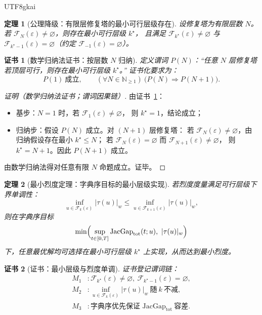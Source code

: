 \documentclass[12pt]{article}
\newtheorem{theorem}{定理}[section]
\newtheorem{Certificate}{证书}[section]
\newcommand{\NN}{\mathbb{N}}
\newcommand{\JacGap}{\ensuremath{\mathrm{JacGap}}} %
\begin{document}
\begin{CJK*}{UTF8}{gkai}
\begin{theorem}[公理降级：有限层修复塔的最小可行层级存在]
\label{thm:min-feasible-layer-exists}
设修复塔为有限层数 $N$。若 $\mathcal{F}_N(\varepsilon)\neq\varnothing$，则存在最小可行层级 $k^\star$，
且满足 $\mathcal{F}_{k^\star}(\varepsilon)\neq\varnothing$ 与 $\mathcal{F}_{k^\star-1}(\varepsilon)=\varnothing$（约定
  $\mathcal{F}_{-1}(\varepsilon)=\varnothing$）。
\end{theorem}

\begin{Certificate}[数学归纳法证书：按层数 $N$ 归纳]
\label{cert:min-feasible-layer-exists}
定义谓词 $P(N)$：“任意 $N$ 层修复塔若顶层可行，则存在最小可行层级 $k^\star$。”
证书化要求为：
\[
  P(1)\ \text{成立},\qquad
  (\forall N\in\NN_{\ge 1})\ \bigl(P(N)\Rightarrow P(N+1)\bigr).
\]
\end{Certificate}

\begin{proof}[证明（数学归纳法证书；谓词因果链）]
由证书~\ref{cert:min-feasible-layer-exists}：
\begin{itemize}
  \item 基步：$N=1$ 时，若 $\mathcal{F}_1(\varepsilon)\neq\varnothing$，
  则 $k^\star=1$，结论成立；
  \item 归纳步：假设 $P(N)$ 成立。对 $(N+1)$ 层修复塔：
  若 $\mathcal{F}_N(\varepsilon)\neq\varnothing$，由归纳假设存在最小 $k^\star\le N$；
  若 $\mathcal{F}_N(\varepsilon)=\varnothing$ 而 $\mathcal{F}_{N+1}(\varepsilon)\neq\varnothing$，
  则 $k^\star=N+1$。因此 $P(N+1)$ 成立。
\end{itemize}
由数学归纳法得对任意有限 $N$ 命题成立。证毕。
\end{proof}

\begin{theorem}[最小烈度定理：字典序目标的最小层级实现]
\label{thm:lexicographic-min-intensity}
若烈度度量满足可行层级下界单调性：
\[
  \inf_{u\in\mathcal{F}_k(\varepsilon)}|\tau(u)|_w
  \le
  \inf_{u\in\mathcal{F}_{k+1}(\varepsilon)}|\tau(u)|_w,
\]
则在字典序目标
\[
  \min\Bigl(\sup_{t\in[0,T]}\JacGap_{\mathrm{tot}}(t;u),\ |\tau(u)|_w\Bigr)
\]
下，任意最优解均可选择在最小可行层级 $k^\star$ 上实现，从而达到最小烈度。
\end{theorem}

\begin{Certificate}[证书：最小层级与烈度单调]
\label{cert:lexicographic-min-intensity}
证书登记谓词链：
\[
\begin{aligned}
  M_1 &: \mathcal{F}_{k^\star}(\varepsilon)\neq\varnothing,\ \mathcal{F}_{k^\star-1}(\varepsilon)=\varnothing,\\
  M_2 &: \inf_{u\in\mathcal{F}_k(\varepsilon)}|\tau(u)|_w\ \text{随}\ k\ \text{不减},\\
  M_3 &: \text{字典序优先保证 }\JacGap_{\mathrm{tot}}\ \text{容差}.
\end{aligned}
\]
\end{Certificate}


\end{CJK*}
\end{document}
